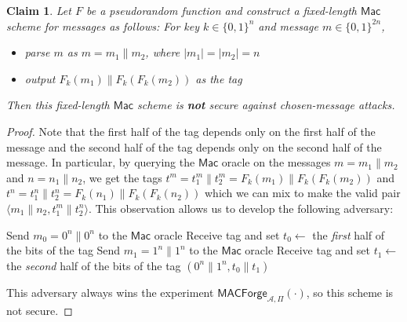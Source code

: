 \documentclass[12pt]{article}
\numberwithin{equation}{section}
\theoremstyle{plain}
\newtheorem{claim}{Claim}
\newcommand{\set}[1]{\{ #1 \}}
\newcommand{\algo}[1]{\mathsf{#1}}
\newcommand{\adv}{\mathcal{A}}
\newcommand{\mac}{\algo{Mac}}
\newcommand{\macexpir}[2]{\algo{MACForge}_{{#1},{#2}}}
\begin{document}
\begin{claim}
Let $F$ be a pseudorandom function
and construct a fixed-length $\mac$ scheme for messages as follows:
For key $k \in \set{ 0, 1 }^n$ and message $m \in \set{ 0, 1 }^{2n}$,
\begin{itemize}
    \item parse $m$ as $m = m_1 \| m_2$, where $|m_1| = |m_2| = n$
    \item output $F_k(m_1) \| F_k(F_k(m_2))$ as the tag
\end{itemize}
Then this fixed-length $\mac$ scheme is \textbf{not} secure against chosen-message attacks.
\end{claim}
\begin{proof}
Note that the first half of the tag depends only on the first half of
the message and the second half of the tag depends only on the second
half of the message.
In particular, by querying the $\mac$ oracle on the messages
$m = m_1 \| m_2$ and $n = n_1 \| n_2$,
we get the tags
$t^m = t^m_1 \| t^m_2 = F_k(m_1) \| F_k(F_k(m_2))$ and $t^n = t^n_1 \| t^n_2 = F_k(n_1) \| F_k(F_k(n_2))$
which we can mix to make the valid pair
$\langle m_1 \| n_2, t^m_1 \| t^n_2 \rangle$.
This observation allows us to develop the following adversary:
\begin{algorithm}[H]
\begin{algorithmic}
    \State Send $m_0 = 0^n \| 0^n$ to the $\mac$ oracle
    \State Receive tag and set $t_0 \gets$ the \textit{first} half of the bits of the tag
    \State Send $m_1 = 1^n \| 1^n$ to the $\mac$ oracle
    \State Receive tag and set $t_1 \gets$ the \textit{second} half of the bits of the tag
    \State \Return $(0^n \| 1^n, t_0 \| t_1)$
\EndProcedure
\end{algorithmic}
\end{algorithm}
This adversary always wins the experiment $\macexpir{\adv}{\Pi}(\cdot)$,
so this scheme is not secure.
\end{proof}
\end{document}
